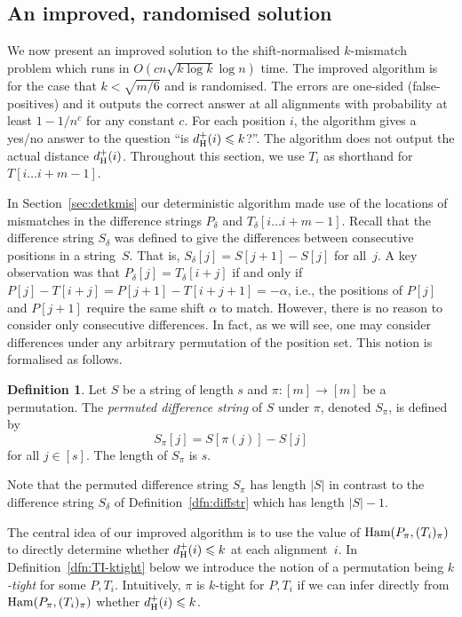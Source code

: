 \documentclass[11pt]{article}
\renewcommand{\leq}{\leqslant}
\newcommand{\ham}{\ensuremath{\textup{Ham}}}
\newcommand{\upto}{\ldots}
\newcommand{\DsHam}{\ensuremath{d_\textup{H}^+}}
\newcommand{\dHam}{\DsHam}
\theoremstyle{plain}
\theoremstyle{definition}
\newtheorem{definition}[theorem]{Definition}
\begin{document}
\subsection{An improved, randomised solution} \label{sec:randkmis}

We now present an improved solution to the shift-normalised $k$-mismatch problem which runs in $O(cn \sqrt{k \log k} \log n)$ time. The improved algorithm is for the case that $k<\sqrt{m/6}$ and is randomised. The errors are one-sided (false-positives) and it outputs the correct answer at all alignments with probability at least $1-1/n^c$ for any constant $c$. For each position $i$, the algorithm gives a yes/no answer to the question ``is $\dHam(i) \leq k$?''. The algorithm does not output the actual distance $\dHam(i)$. Throughout this section, we use $T_i$ as shorthand for $T[i \upto i+m-1]$.

In Section~\ref{sec:detkmis} our deterministic algorithm made use of the locations of mismatches in the difference strings $P_\delta$ and $T_\delta[i \ldots i+m-1]$. Recall that the difference string $S_\delta$ was defined to give the differences between consecutive positions in a string~$S$. That is, $S_\delta[j]=S[j+1]-S[j]$ for all~$j$. A key observation was that $P_\delta[j]=T_\delta [i+j]$ if and only if $P[j]-T[i+j]=P[j+1]-T[i+j+1]=-\alpha$, i.e., the positions of $P[j]$ and $P[j+1]$ require the same shift $\alpha$ to match. However, there is no reason to consider only consecutive differences. In fact, as we will see, one may consider differences under any arbitrary permutation of the position set. This notion is formalised as follows.

\begin{definition}
    \label{dfn:pdiffstr}
    Let $S$ be a string of length $s$ and $\pi : [m] \to [m]$ be a permutation. The \emph{permuted difference string} of $S$ under $\pi$, denoted $S_\pi$, is defined by
\begin{equation*}
        S_\pi[j] = S[\pi(j)] - S[j]
    \end{equation*}
for all $j\in [s]$. The length of $S_\pi$ is $s$.
\end{definition}

Note that the permuted difference string  $S_\pi$ has length $|S|$ in contrast to the difference string $S_\delta$ of Definition~\ref{dfn:diffstr} which has length $|S|-1$.

The central idea of our improved algorithm is to use the value of $\ham(P_\pi,(T_i)_{\pi})$ to directly determine whether $\dHam(i) \leq k$ at each alignment~$i$. In Definition~\ref{dfn:TI-ktight} below we introduce the notion of a permutation being \emph{$k$-tight} for some $P,T_i$. Intuitively, $\pi$ is $k$-tight for $P,T_i$ if we can infer directly from $\ham(P_\pi,(T_i)_{\pi})$ whether $\dHam(i) \leq k$.
\end{document}
